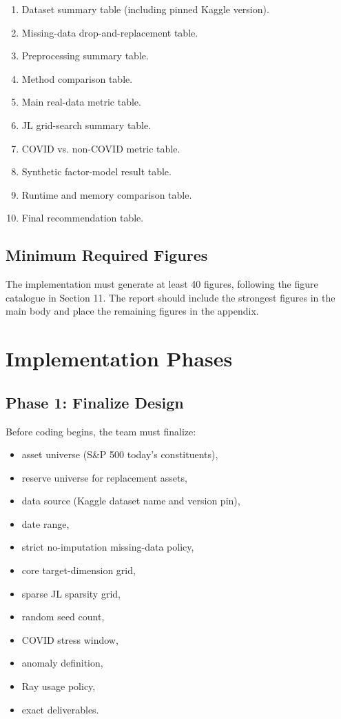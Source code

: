 \documentclass[11pt]{article}
\begin{document}
\begin{enumerate}
    \item Dataset summary table (including pinned Kaggle version).
    \item Missing-data drop-and-replacement table.
    \item Preprocessing summary table.
    \item Method comparison table.
    \item Main real-data metric table.
    \item JL grid-search summary table.
    \item COVID vs. non-COVID metric table.
    \item Synthetic factor-model result table.
    \item Runtime and memory comparison table.
    \item Final recommendation table.
\end{enumerate}

\subsection{Minimum Required Figures}

The implementation must generate at least 40 figures, following the figure catalogue in Section 11. The report should include the strongest figures in the main body and place the remaining figures in the appendix.

\section{Implementation Phases}

\subsection{Phase 1: Finalize Design}

Before coding begins, the team must finalize:

\begin{itemize}
    \item asset universe (S\&P 500 today's constituents),
    \item reserve universe for replacement assets,
    \item data source (Kaggle dataset name and version pin),
    \item date range,
    \item strict no-imputation missing-data policy,
    \item core target-dimension grid,
    \item sparse JL sparsity grid,
    \item random seed count,
    \item COVID stress window,
    \item anomaly definition,
    \item Ray usage policy,
    \item exact deliverables.
\end{itemize}
\end{document}
